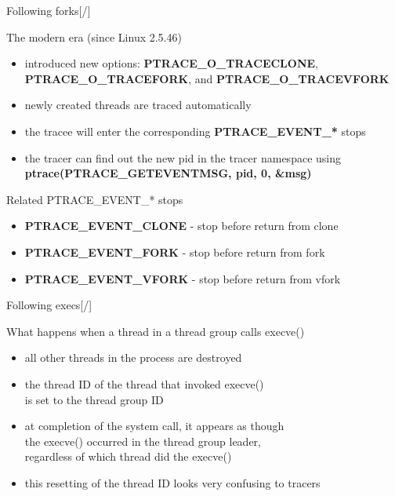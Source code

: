 \documentclass[unicode,aspectratio=169,xcolor={table,dvipsnames,usenames}]{beamer}
\begin{document}
\begin{frame}{\Large Following forks\hfill [\insertframenumber/\inserttotalframenumber]}
\large
\begin{block}{The modern era (since Linux 2.5.46)}
\begin{itemize}
	\item introduced new options:
		\textbf{PTRACE\_O\_TRACECLONE}, \textbf{PTRACE\_O\_TRACEFORK},
		and \textbf{PTRACE\_O\_TRACEVFORK}
	\item newly created threads are traced automatically
	\item the tracee will enter the corresponding \textbf{PTRACE\_EVENT\_*} stops
	\item the tracer can find out the new pid in the tracer namespace using
		\textbf{ptrace(PTRACE\_GETEVENTMSG, pid, 0, \&msg)} \\
\end{itemize}
\end{block}

\begin{block}{Related PTRACE\_EVENT\_* stops}
\begin{itemize}
	\item \textbf{PTRACE\_EVENT\_CLONE} - stop before return from clone
	\item \textbf{PTRACE\_EVENT\_FORK} - stop before return from fork
	\item \textbf{PTRACE\_EVENT\_VFORK} - stop before return from vfork
\end{itemize}
\end{block}
\end{frame}

\begin{frame}{\Large Following execs\hfill [\insertframenumber/\inserttotalframenumber]}
\Large
\begin{block}{What happens when a thread in a thread group calls execve()}
\begin{itemize}
	\item all other threads in the process are destroyed
	\item the thread ID of the thread that invoked execve() \\
		is set to the thread group ID
	\item at completion of the system call, it appears as though \\
		the execve() occurred in the thread group leader, \\
		regardless of which thread did the execve()
	\item this resetting of the thread ID looks very confusing to tracers
\end{itemize}
\end{block}
\end{frame}
\end{document}
